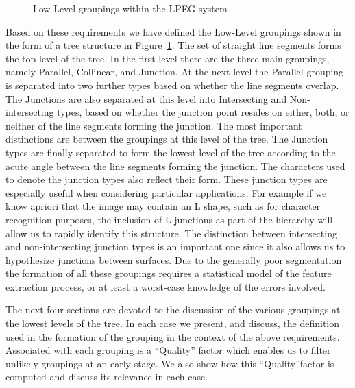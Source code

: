 \begin{figure}[htbp]
\vspace*{-10mm}
\vspace*{4cm}
\vspace*{-5mm}
\caption{Low-Level groupings within the LPEG system}
\label{fig:groupings}
\end{figure}

 Based on these requirements we have defined the Low-Level groupings shown in
the form of a tree structure in Figure~\ref{fig:groupings}. The set of straight
line segments forms the top level of the tree. In the first level there are 
the three main groupings, namely Parallel, Collinear, and Junction. At the 
next level the Parallel grouping is separated into two further types based on 
whether the line segments overlap. The Junctions are also separated at this 
level into Intersecting and Non-intersecting types, based on whether the 
junction point resides on either, both, or neither of the line segments 
forming the junction. The most important distinctions are between the 
groupings at this level of the tree. The Junction types are finally separated 
to form the lowest level of the tree according to the acute angle between the 
line segments forming the junction. The characters used to denote the junction
types also reflect their form. These junction types are especially useful when 
considering particular applications. For example if we know apriori that the 
image may contain an L shape, such as for character recognition purposes, the 
inclusion of L junctions as part of the hierarchy will allow us to rapidly 
identify this structure. The distinction between intersecting and 
non-intersecting junction types is an important one since it also allows us to 
hypothesize junctions between surfaces. Due to the generally poor segmentation 
the formation of all these groupings requires a statistical model of the 
feature extraction process, or at least a worst-case knowledge of the errors 
involved. 

 The next four sections are devoted to the discussion of the various 
groupings at the lowest levels of the tree. In each case we present, and 
discuss, the definition used in the formation of the grouping in the context of
the above requirements. Associated with each grouping is a ``Quality'' factor 
which enables us to filter unlikely groupings at an early stage. We also show 
how this ``Quality''factor is computed and discuss its relevance in each case.

